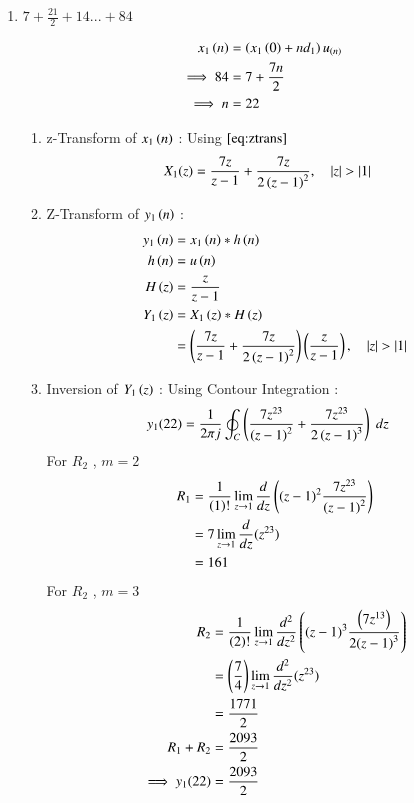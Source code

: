 \documentclass[journal,12pt,onecolumn]{IEEEtran}
\theoremstyle{remark}
\begin{document}
\begin{enumerate}
\item
$ 7 + \frac{21}{2} + 14 ... + 84$


\begin{align}
x_1\left(n\right) &= \left(x_1\left(0\right) + nd_1\right)u_{\left(n\right)}\\
\implies 84 &= 7+\frac{7n}{2}\\
\implies n &= 22
\end{align}

\begin{enumerate}    
\item 
z-Transform of $x_1\left(n\right)$ :
Using $\eqref{eq:ztrans}$
\begin{align}
X_1(z)&= \frac{7z}{z-1} + \frac{7z}{{2\left(z-1\right)}^{2}} \label{eq:ee25-4}
,\quad \left\vert z\right\vert>\left\vert1\right\vert 
\end{align}
\item
Z-Transform of $y_1\left(n\right)$ :
\begin{align}
    y_1\left(n\right) &= x_1\left(n\right) * h\left(n\right) \\
         h\left(n\right) &= u\left(n\right) \\
                 H\left(z\right) &= \frac{z}{z-1} \label{eq:ee25-9}\\
    Y_1\left(z\right) &= X_1\left(z\right) * H\left(z\right)\\
 &= \left(\frac{7z}{z-1}+
\frac{7z}{2\left(z-1\right)^{2}}\right)\left(\frac{z}{z-1}\right)
,\quad \left\vert z\right\vert>\left\vert1\right\vert     
\end{align}
        \item
Inversion of $Y_1\left(z\right)$ :
Using Contour Integration :
\begin{align}
    y_1{(22)}&=\frac{1}{2\pi j}\oint_{C}\left(\frac{7z^{23}}{\left(z-1\right)^2}+
       \frac{7z^{23}}{2\left(z-1\right)^3}\right) \;dz 
\end{align}
    For $R_2$ , $m=2$ 
\begin{align}
  R_1 &=\frac{1}{\left(1\right)!}\lim\limits_{z\to 1}\frac{d}{dz}\left({(z-1)}^{2}\frac{7z^{23}}{{(z-1)}^2}\right)   \\
    &=7\lim\limits_{z\to 1}\frac{d}{dz}(z^{23})   \\
    &= 161
    \end{align}
    For $R_2$ , $m=3$ 
    \begin{align}
    R_2 &=\frac{1}{\left(2\right)!}\lim\limits_{z\to 1}\frac{d^{2}}{dz^{2}}\left({(z-1)}^{3}\frac{\left(7z^{13}\right)}{{2(z-1)}^3}\right)   \\
    &=\left(\frac{7}{4}\right)\lim\limits_{z\to 1}\frac{d^2}{dz^2}(z^{23})   \\
    &= \frac{1771}{2}\\
    R_1 + R_2 &= \frac{2093}{2}\\
    \implies  y_1{(22)} &= \frac{2093}{2}
\end{align}
\end{enumerate}   


\end{enumerate}
\end{document}
